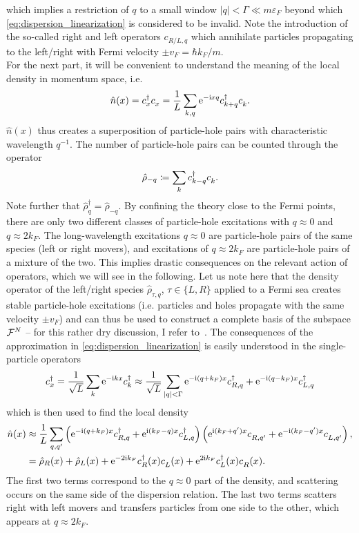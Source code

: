 which implies a restriction of $q$ to a small window $|q|<\Gamma\ll m\varepsilon_F$ beyond which \cref{eq:dispersion_linearization} is considered to be invalid.
Note the introduction of the so-called right and left operators $c_{R/L,q}$ which annihilate particles propagating to the left/right with Fermi velocity $\pm v_F=\hbar k_F/m$.
\\

For the next part, it will be convenient to understand the meaning of the local density in momentum space, i.e.
\begin{align}
    \hat n(x) = c^\dag_x c^\pdag_x = \frac1L\sum_{k,q}\re^{-\ri x q}c^\dag_{k+q}c^\pdag_{k}.
    \label{eq:local_density}
\end{align}
$\hat n(x)$ thus creates a superposition of particle-hole pairs with characteristic wavelength $q^{-1}$.
The number of particle-hole pairs can be counted through the operator
\begin{align}
    \hat \rho_{-q}\coloneqq \sum_k c^\dag_{k-q}c^\pdag_{k}.
\end{align}
Note further that $\hat\rho_q^\dag = \hat\rho_{-q}$.
By confining the theory close to the Fermi points, there are only two different classes of particle-hole excitations with $q\approx 0$ and $q\approx2k_F$.
The long-wavelength excitations $q\approx0$ are particle-hole pairs of the same species (left or right movers), and excitations of $q\approx2k_F$ are particle-hole pairs of a mixture of the two.
This implies drastic consequences on the relevant action of operators, which we will see in the following.
Let us note here that the density operator of the left/right species $\hat\rho_{\tau,q}$, $\tau\in\{L,R\}$ applied to a Fermi sea creates stable particle-hole excitations (i.e. particles and holes propagate with the same velocity $\pm v_F$) and can thus be used to construct a complete basis of the subspace $\mathcal{F}^N$ -- for this rather dry discussion, I refer to~\cite{vonDelft1998}.
The consequences of the approximation in \cref{eq:dispersion_linearization} is easily understood in the single-particle operators
\begin{align}
    c^\dag_x = \frac1{\sqrt L}\sum_k \mathrm e^{-\mathrm i k x}c^\dag_k \approx \frac1{\sqrt L}\sum_{|q|<\Gamma}\mathrm e^{-\mathrm i (q+k_F) x}c^\dag_{R, q} + \mathrm e^{-\mathrm i (q-k_F) x}c^\dag_{L, q}
    \label{eq:confinement_creation_annihilation}
\end{align}
which is then used to find the local density
\begin{align}
    \hat n(x)
    &\approx \frac1L\sum_{q,q'}\brlr{\re^{-\ri (q+k_F) x}c^\dag_{R, q} + \re^{\ri (k_F-q) x}c^\dag_{L, q}}\brlr{\re^{\ri (k_F+q') x}c^\pdag_{R, q'} + \re^{-\ri (k_F-q') x}c^\pdag_{L, q'}},
    \\
    &= \hat \rho_R(x) + \hat \rho_L(x) + \re^{-2\ri k_F}c^\dag_{R}(x)c^\pdag_{L}(x) + \re^{2\ri k_F}c^\dag_{L}(x)c^\pdag_{R}(x).
    \label{eq:local_density_approximation}
\end{align}
The first two terms correspond to the $q\approx0$ part of the density, and scattering occurs on the same side of the dispersion relation.
The last two terms scatters right with left movers and transfers particles from one side to the other, which appears at $q\approx2k_F$.
\\

